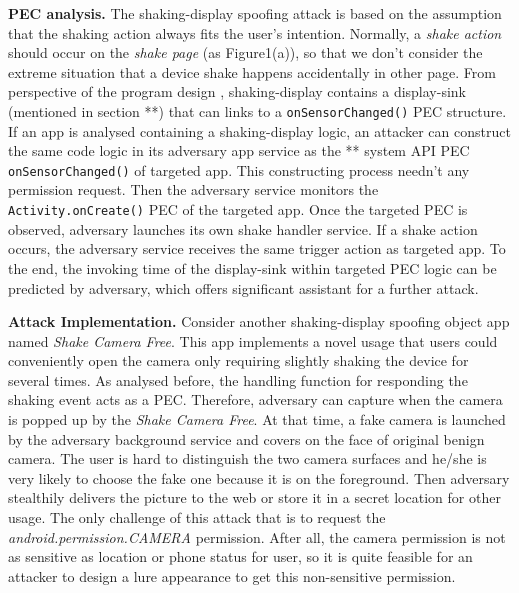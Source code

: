 \textbf{PEC analysis.} The shaking-display spoofing attack is based on the assumption that the shaking action always fits the user's intention. Normally, a \textit{shake action} should occur on the \textit{shake page} (as Figure1(a)), so that we don't consider the extreme situation that a device shake happens accidentally in other page. From perspective of the program design , shaking-display contains a display-sink (mentioned in section **) that can links to a \texttt{onSensorChanged()} PEC structure. If an app is analysed containing a shaking-display logic,  an attacker can construct the same code logic in its adversary app service as the ** system API PEC \texttt{onSensorChanged()} of targeted app. This constructing process needn't any permission request. Then the adversary service monitors the \texttt{Activity.onCreate()} PEC of the targeted app. Once the targeted PEC is observed, adversary launches its own shake handler service. If a shake action occurs, the adversary service receives the same trigger action as targeted app. To the end, the invoking time of the display-sink within targeted PEC logic can be predicted by adversary, which offers significant assistant for a further attack. 


\textbf{Attack Implementation.}
Consider another shaking-display spoofing object app named \textit{Shake Camera Free}. This app implements a novel usage that users could conveniently open the camera only requiring slightly shaking the device for several times. As analysed before, the handling function for responding the shaking event acts as a PEC. Therefore, adversary can capture when the camera is popped up by the \textit{Shake Camera Free}. At that time, a fake camera is launched by the adversary background service and covers on the face of original benign camera. The user is hard to distinguish the two camera surfaces and he/she is very likely to choose the fake one because it is on the foreground. Then adversary stealthily delivers the picture to the web or store it in a secret location for other usage. The only challenge of this attack that is to request the \textit{android.permission.CAMERA} permission. After all, the camera permission is not as sensitive as location or phone status for user, so it is quite feasible for an attacker to design a lure appearance to get this non-sensitive permission.



